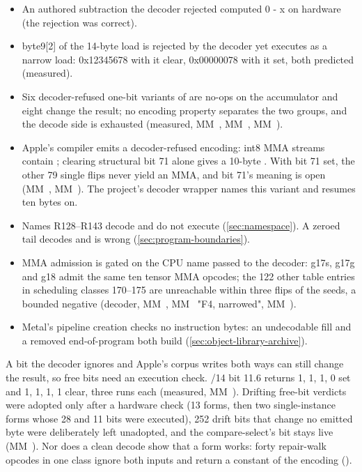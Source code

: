 \begin{itemize}
\item An authored subtraction the decoder rejected computed 0 - x on hardware (the rejection was correct).
\item byte9{[}2{]} of the 14-byte load is rejected by the decoder yet executes as a narrow load: 0x12345678 with it clear,
  0x00000078 with it set, both predicted (measured).
\item Six decoder-refused one-bit variants of  are no-ops on the accumulator and eight change the result; no encoding
  property separates the two groups, and the decode side is exhausted (measured, MM~, MM~, MM~).
\item Apple's compiler emits a decoder-refused encoding: int8 MMA streams contain ; clearing structural
  bit 71 alone gives a 10-byte . With bit 71 set, the other 79 single flips
  never yield an MMA, and bit 71's meaning is open (MM~, MM~). The project's decoder wrapper names this variant
  and resumes ten bytes on.
\item Names R128–R143 decode and do not execute (\cref{sec:namespace}). A zeroed  tail decodes and is wrong (\cref{sec:program-boundaries}).
\item MMA admission is gated on the CPU name passed to the decoder: g17s, g17g and g18 admit the same ten tensor MMA opcodes;
  the 122 other table entries in scheduling classes 170–175 are unreachable within three flips of the seeds, a bounded
  negative (decoder, MM~, MM~ "F4, narrowed", MM~).
\item Metal's pipeline creation checks no instruction bytes: an undecodable  fill and a removed end-of-program both
  build (\cref{sec:object-library-archive}).
\end{itemize}

A bit the decoder ignores and Apple's corpus writes both ways can still change the result, so free bits need an
execution check. /14 bit 11.6 returns 1, 1, 1, 0 set and 1, 1, 1, 1 clear,
three runs each (measured, MM~). Drifting free-bit verdicts were adopted only after a hardware check (13 forms, then
two single-instance forms whose 28 and 11 bits were executed), 252 drift bits that change no emitted byte were
deliberately left unadopted, and the compare-select's bit stays live (MM~). Nor does a clean decode show that a form
works: forty repair-walk opcodes in one class ignore both inputs and return a constant of the encoding
().

